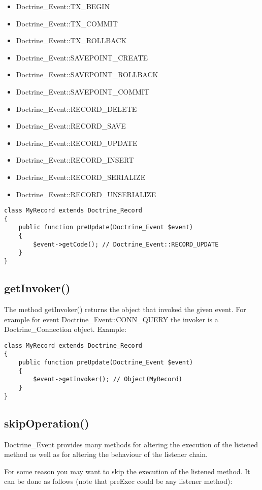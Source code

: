 \documentclass[11pt,a4paper]{report}
\begin{document}
\begin{itemize}
\item{Doctrine\_Event::TX\_BEGIN}
\item{Doctrine\_Event::TX\_COMMIT}
\item{Doctrine\_Event::TX\_ROLLBACK}
\item{Doctrine\_Event::SAVEPOINT\_CREATE}
\item{Doctrine\_Event::SAVEPOINT\_ROLLBACK}
\item{Doctrine\_Event::SAVEPOINT\_COMMIT}
\item{Doctrine\_Event::RECORD\_DELETE}
\item{Doctrine\_Event::RECORD\_SAVE}
\item{Doctrine\_Event::RECORD\_UPDATE}
\item{Doctrine\_Event::RECORD\_INSERT}
\item{Doctrine\_Event::RECORD\_SERIALIZE}
\item{Doctrine\_Event::RECORD\_UNSERIALIZE}
\end{itemize}
\begin{verbatim}
class MyRecord extends Doctrine_Record
{
    public function preUpdate(Doctrine_Event $event)
    {
        $event->getCode(); // Doctrine_Event::RECORD_UPDATE
    }
}
\end{verbatim}

\subsection{getInvoker()}
The method getInvoker() returns the object that invoked the given event. For example for event Doctrine\_Event::CONN\_QUERY the invoker is a Doctrine\_Connection object. Example:

\begin{verbatim}
class MyRecord extends Doctrine_Record
{
    public function preUpdate(Doctrine_Event $event)
    {
        $event->getInvoker(); // Object(MyRecord)
    }
}
\end{verbatim}

\subsection{skipOperation()}
Doctrine\_Event provides many methods for altering the execution of the listened method as well as for altering the behaviour of the listener chain.

For some reason you may want to skip the execution of the listened method. It can be done as follows (note that preExec could be any listener method):
\end{document}

